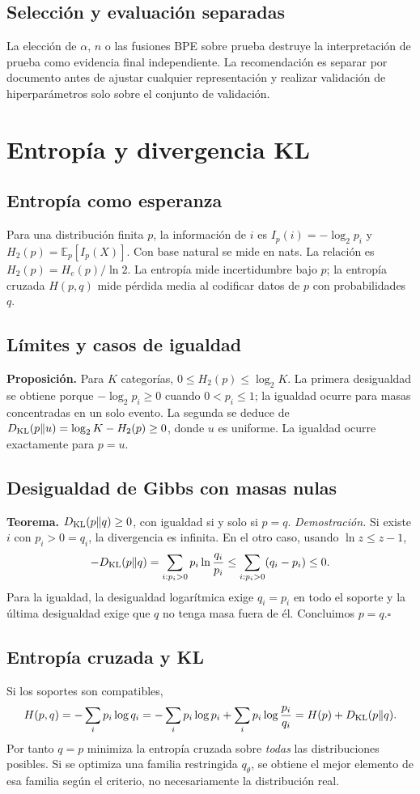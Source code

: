 \documentclass[11pt,a4paper]{report}
\begin{document}
\section{Selección y evaluación separadas}
La elección de $\alpha$, $n$ o las fusiones BPE sobre prueba destruye la
interpretación de prueba como evidencia final independiente. La recomendación
es separar por documento antes de ajustar cualquier representación y realizar
validación de hiperparámetros solo sobre el conjunto de validación.

\chapter{Entropía y divergencia KL}
\section{Entropía como esperanza}
Para una distribución finita $p$, la información de $i$ es
$I_p(i)=-\log_2p_i$ y $H_2(p)=\mathbb E_p[I_p(X)]$.
Con base natural se mide en nats. La relación es
$H_2(p)=H_e(p)/\ln2$. La entropía mide incertidumbre bajo $p$;
la entropía cruzada $H(p,q)$ mide pérdida media al codificar datos de $p$
con probabilidades $q$.
\section{Límites y casos de igualdad}
\textbf{Proposición.} Para $K$ categorías,
$0\le H_2(p)\le\log_2K$. La primera desigualdad se obtiene porque
$-\log_2p_i\ge0$ cuando $0<p_i\le1$; la igualdad ocurre para masas
concentradas en un solo evento. La segunda se deduce de
$D_{\rm KL}(p\|u)=\log_2K-H_2(p)\ge0$, donde $u$ es uniforme.
La igualdad ocurre exactamente para $p=u$.
\section{Desigualdad de Gibbs con masas nulas}
\textbf{Teorema.} $D_{\rm KL}(p\|q)\ge0$, con igualdad si y solo si $p=q$.
\textit{Demostración.} Si existe $i$ con $p_i>0=q_i$, la divergencia es
infinita. En el otro caso, usando $\ln z\le z-1$,
\[
-D_{\rm KL}(p\|q)=\sum_{i:p_i>0}p_i\ln\frac{q_i}{p_i}
\le\sum_{i:p_i>0}(q_i-p_i)\le0.
\]
Para la igualdad, la desigualdad logarítmica exige $q_i=p_i$ en todo el
soporte y la última desigualdad exige que $q$ no tenga masa fuera de él.
Concluimos $p=q$.\hfill$\square$
\section{Entropía cruzada y KL}
Si los soportes son compatibles,
\[
H(p,q)=-\sum_ip_i\log q_i
=-\sum_ip_i\log p_i+\sum_ip_i\log\frac{p_i}{q_i}
=H(p)+D_{\rm KL}(p\|q).
\]
Por tanto $q=p$ minimiza la entropía cruzada sobre \emph{todas} las
distribuciones posibles. Si se optimiza una familia restringida $q_\theta$,
se obtiene el mejor elemento de esa familia según el criterio, no
necesariamente la distribución real.
\end{document}
